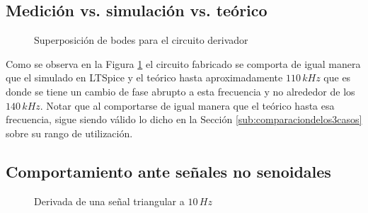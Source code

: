 \subsection{Medición vs. simulación vs. teórico}
\begin{figure}[H]
	\begin{center}
		\caption{Superposición de bodes para el circuito derivador}
		\label{fig:superposiciontrescasos}
	\end{center}
\end{figure}

Como se observa en la Figura \ref{fig:superposiciontrescasos} el circuito fabricado se comporta de igual manera que el simulado en LTSpice y el teórico hasta aproximadamente $110 \, kHz$ que es donde se tiene un cambio de fase abrupto a esta frecuencia y no alrededor de los $140 \, kHz$. Notar que al comportarse de igual manera que el teórico hasta esa frecuencia, sigue siendo válido lo dicho en la Sección \ref{sub:comparaciondelos3casos} sobre su rango de utilización.

\subsection{Comportamiento ante señales no senoidales}

\begin{figure}[H]
	\begin{center}
		\caption{Derivada de una señal triangular a $10 \, Hz$}
		\label{fig:derivtriangNOcomp10Hz}
	\end{center}
\end{figure}


